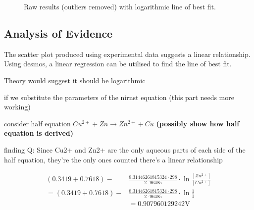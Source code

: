 \documentclass[11pt,a4paper]{article}
\begin{document}
\begin{figure}[h]
	\centering
	\caption{Raw results (outliers removed) with logarithmic line of best fit.}
\end{figure}


\subsection{Analysis of Evidence}
The scatter plot produced using experimental data suggests a linear relationship. Using desmos, a linear regression can be utilised to find the line of best fit. 





Theory would suggest it should be logarithmic 

if we substitute the parameters of the nirnst equation (this part needs more working)

consider half equation $Cu^{2+}+Zn \rightarrow Zn^{2+} + Cu$ \textbf{(possibly show how half equation is derived)}

finding Q: Since Cu2+ and Zn2+ are the only aqueous parts of each side of the half equation, they're the only ones counted
there's a linear relationship

\begin{align*}
	(0.3419+0.7618)-&\frac{8.31446261815324\cdot298}{2\cdot96485}\cdot\ln\frac{[Zn^{2+}]}{[Cu^{2+}]}\\
	=(0.3419+0.7618)-&\frac{8.31446261815324\cdot298}{2\cdot96485}\cdot\ln\frac{1}{1}\\
	&=0.907960129242\textrm{V}
\end{align*}
\end{document}
